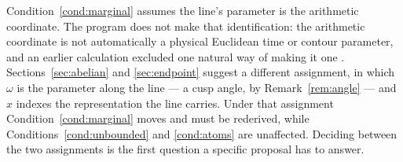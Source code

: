 \begin{remark}\label{rem:identification}
Condition~\ref{cond:marginal} assumes the line's parameter is the arithmetic
coordinate. The program does not make that identification: the arithmetic
coordinate is not automatically a physical Euclidean time or contour parameter,
and an earlier calculation excluded one natural way of making it one
\cite{GaugeTransfer,InverseBulk}. Sections~\ref{sec:abelian} and
\ref{sec:endpoint} suggest a different assignment, in which $\omega$ is the
parameter along the line --- a cusp angle, by Remark~\ref{rem:angle} --- and $x$
indexes the representation the line carries. Under that assignment
Condition~\ref{cond:marginal} moves and must be rederived, while
Conditions~\ref{cond:unbounded} and \ref{cond:atoms} are unaffected. Deciding
between the two assignments is the first question a specific proposal has to
answer.
\end{remark}
